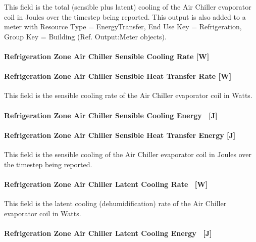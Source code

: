 This field is the total (sensible plus latent) cooling of the Air Chiller evaporator coil in Joules over the timestep being reported. This output is also added to a meter with Resource Type = EnergyTransfer, End Use Key = Refrigeration, Group Key = Building (Ref. Output:Meter objects).

\paragraph{Refrigeration Zone Air Chiller Sensible Cooling Rate {[}W{]}}\label{refrigeration-zone-air-chiller-sensible-cooling-rate-w-1}

\paragraph{Refrigeration Zone Air Chiller Sensible Heat Transfer Rate {[}W{]}}\label{refrigeration-zone-air-chiller-sensible-heat-transfer-rate-w-1}

This field is the sensible cooling rate of the Air Chiller evaporator coil in Watts.

\paragraph{Refrigeration Zone Air Chiller Sensible Cooling Energy ~{[}J{]}}\label{refrigeration-zone-air-chiller-sensible-cooling-energy-j}

\paragraph{Refrigeration Zone Air Chiller Sensible Heat Transfer Energy {[}J{]}}\label{refrigeration-zone-air-chiller-sensible-heat-transfer-energy-j-1}

This field is the sensible cooling of the Air Chiller evaporator coil in Joules over the timestep being reported.

\paragraph{Refrigeration Zone Air Chiller Latent Cooling Rate ~{[}W{]}}\label{refrigeration-zone-air-chiller-latent-cooling-rate-w-1}

This field is the latent cooling (dehumidification) rate of the Air Chiller evaporator coil in Watts.

\paragraph{Refrigeration Zone Air Chiller Latent Cooling Energy ~{[}J{]}}\label{refrigeration-zone-air-chiller-latent-cooling-energy-j}

